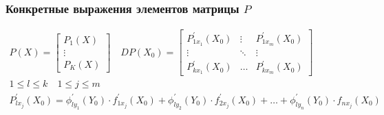 \documentclass[main]{subfiles}
\begin{document}
    \subsubsection{Конкретные выражения элементов матрицы $P$} 
    \begin{gather*}
        P(X) = \begin{bmatrix*}
            P_1(X) \\
            \vdots \\
            P_K(X) 
        \end{bmatrix*} \quad DP(X_0) = \begin{bmatrix*}
            P_{1x_1}^\prime(X_0) & \vdots & P_{1x_m}^\prime(X_0) \\
            \vdots & \ddots & \vdots \\
            P_{kx_1}^\prime(X_0) & \ldots & P_{kx_m}^\prime(X_0)
        \end{bmatrix*} \\
        1 \leq l \leq k \quad 1 \leq j \leq m \\
        P^\prime_{lx_j}(X_0) = \phi^\prime_{ly_1}(Y_0) \cdot f^\prime_{1x_j}(X_0) + \phi^\prime_{ly_2}(Y_0) \cdot f^\prime_{2x_j}(X_0) + \ldots +
        \phi^\prime_{ly_n} (Y_0) \cdot f_{nx_j}(X_0)
    \end{gather*}
\end{document}

